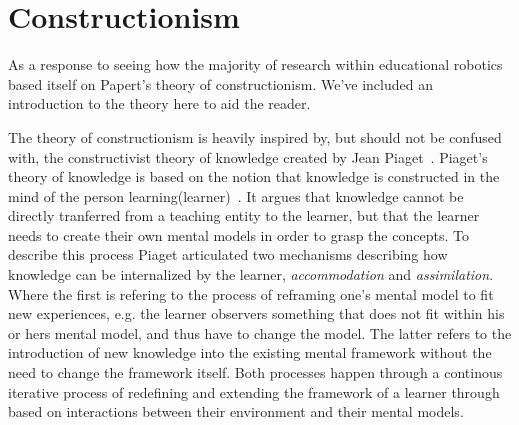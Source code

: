 \section{Constructionism}\label{chap:constructionism}
As a response to seeing how the majority of research within educational robotics based itself on Papert's theory of constructionism.
We've included an introduction to the theory here to aid the reader.

\bigskip\noindent
The theory of constructionism is heavily inspired by, but should not be confused with, the constructivist theory of knowledge created by Jean Piaget~\cite{cakir2008constructivist}.
Piaget's theory of knowledge is based on the notion that knowledge is constructed in the mind of the person learning(learner)~\cite{bodner1986constructivism}. It argues that knowledge cannot be directly tranferred from a teaching entity to the learner, but that the learner needs to create their own mental models in order to grasp the concepts. 
To describe this process Piaget articulated two mechanisms describing how knowledge can be internalized by the learner, \textit{accommodation} and \textit{assimilation}. 
Where the first is refering to the process of reframing one's mental model to fit new experiences, e.g. the learner observers something that does not fit within his or hers mental model, and thus have to change the model. The latter refers to the introduction of new knowledge into the existing mental framework without the need to change the framework itself. Both processes happen through a continous iterative process of redefining and extending the framework of a learner through based on  interactions between their environment and their mental models. 


